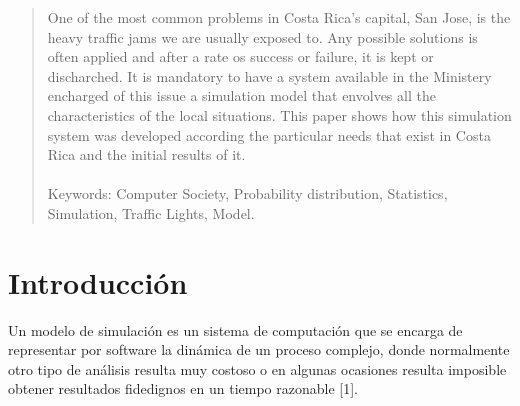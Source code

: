 \documentclass[conference]{IEEEtran}
\begin{document}
\maketitle


\begin{abstract}
One of the most common problems in Costa Rica's capital, San Jose, is the heavy traffic jams we are usually exposed to. Any possible solutions is often applied and after a rate os success or failure, it is kept or discharched. It is mandatory to have a system available in the Ministery encharged of this issue a simulation model that envolves all the characteristics of the local situations. This paper shows how this simulation system was developed according the particular needs that exist in Costa Rica and the initial results of it.\\ \\Keywords: Computer Society, Probability distribution, Statistics, Simulation, Traffic Lights, Model.
\end{abstract}





%
\IEEEpeerreviewmaketitle



\section{Introducci\'on}
Un modelo de simulaci\'on es un sistema de computaci\'on que se encarga de representar por software la din\'amica de un proceso complejo, donde normalmente otro tipo de an\'alisis resulta muy costoso o en algunas ocasiones resulta imposible obtener resultados fidedignos en un tiempo razonable [1].
\end{document}
